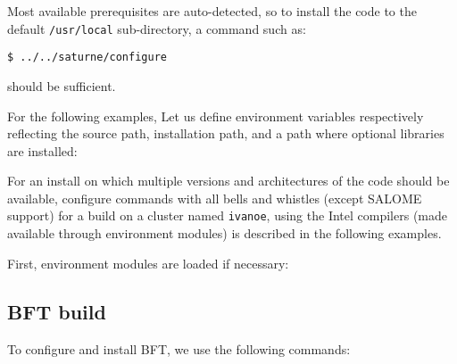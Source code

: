 \documentclass[a4paper,10pt,twoside]{article}
\begin{document}
Most available prerequisites are auto-detected, so to install the
code to the default \texttt{/usr/local} sub-directory,
a command such as:

\texttt{\$ ../../saturne/configure}

should be sufficient.

For the following examples, Let us define environment variables respectively
reflecting the \CS source path, installation path, and a path where optional
libraries are installed:


For an install on which multiple
versions and architectures of the code should be available,
configure commands with all bells and whistles (except SALOME support) for a
build on a cluster named \texttt{ivanoe}, using the Intel compilers
(made available through environment modules) is described in the following
examples.

First, environment modules are loaded if necessary:


\subsection{BFT build\label{sec:bft:config:examples}}

To configure and install BFT, we use the following commands:

\end{document}
